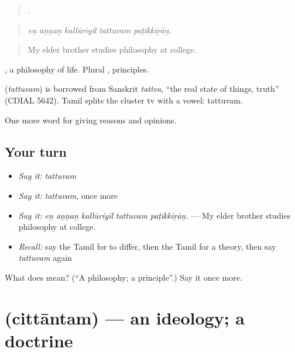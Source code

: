 \begin{quote}
    .
\end{quote}

\begin{quote}
\emph{eṉ aṇṇaṉ kallūriyil tattuvam paṭikkiṟāṉ.}
\end{quote}

\begin{quote}
My elder brother studies philosophy at college.
\end{quote}

 , a philosophy of life. Plural , principles.

\begin{cousinweb}
\textbf{} (\emph{tattuvam}) is borrowed from Sanskrit \emph{tattva}, \textquotedblleft{}the real state of things, truth\textquotedblright{} (CDIAL 5642). Tamil splits the cluster tv with a vowel: tattuvam.
\end{cousinweb}

\begin{grammarlens}[title={What you've built}]
One more word for giving reasons and opinions.
\end{grammarlens}

\subsection*{Your turn}
\begin{itemize}
\raggedright
  \item \emph{Say it:} \emph{tattuvam}
  \item \emph{Say it:} \emph{tattuvam}, once more
  \item \emph{Say it:} \emph{eṉ aṇṇaṉ kallūriyil tattuvam paṭikkiṟāṉ.} — My elder brother studies philosophy at college.
  \item \emph{Recall:} say the Tamil for to differ, then the Tamil for a theory, then say \emph{tattuvam} again
\end{itemize}

\begin{tcolorbox}[breakable,colback=teal!4,colframe=teal!35!black,title={Before you move on}]
What does  mean? (\textquotedblleft{}A philosophy; a principle\textquotedblright{}.) Say it once more.
\end{tcolorbox}
\section[\texorpdfstring{\ta{சித்தாந்தம்} (cittāntam)}{சித்தாந்தம் (cittāntam)}]{ (cittāntam) — an ideology; a doctrine}

